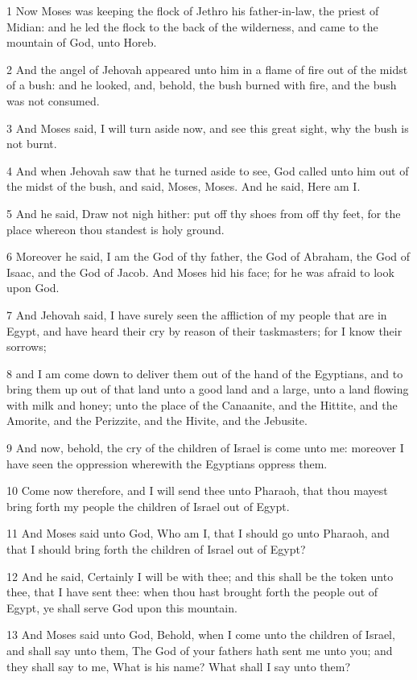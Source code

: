 \par 1 Now Moses was keeping the flock of Jethro his father-in-law, the priest of Midian: and he led the flock to the back of the wilderness, and came to the mountain of God, unto Horeb.
\par 2 And the angel of Jehovah appeared unto him in a flame of fire out of the midst of a bush: and he looked, and, behold, the bush burned with fire, and the bush was not consumed.
\par 3 And Moses said, I will turn aside now, and see this great sight, why the bush is not burnt.
\par 4 And when Jehovah saw that he turned aside to see, God called unto him out of the midst of the bush, and said, Moses, Moses. And he said, Here am I.
\par 5 And he said, Draw not nigh hither: put off thy shoes from off thy feet, for the place whereon thou standest is holy ground.
\par 6 Moreover he said, I am the God of thy father, the God of Abraham, the God of Isaac, and the God of Jacob. And Moses hid his face; for he was afraid to look upon God.
\par 7 And Jehovah said, I have surely seen the affliction of my people that are in Egypt, and have heard their cry by reason of their taskmasters; for I know their sorrows;
\par 8 and I am come down to deliver them out of the hand of the Egyptians, and to bring them up out of that land unto a good land and a large, unto a land flowing with milk and honey; unto the place of the Canaanite, and the Hittite, and the Amorite, and the Perizzite, and the Hivite, and the Jebusite.
\par 9 And now, behold, the cry of the children of Israel is come unto me: moreover I have seen the oppression wherewith the Egyptians oppress them.
\par 10 Come now therefore, and I will send thee unto Pharaoh, that thou mayest bring forth my people the children of Israel out of Egypt.
\par 11 And Moses said unto God, Who am I, that I should go unto Pharaoh, and that I should bring forth the children of Israel out of Egypt?
\par 12 And he said, Certainly I will be with thee; and this shall be the token unto thee, that I have sent thee: when thou hast brought forth the people out of Egypt, ye shall serve God upon this mountain.
\par 13 And Moses said unto God, Behold, when I come unto the children of Israel, and shall say unto them, The God of your fathers hath sent me unto you; and they shall say to me, What is his name? What shall I say unto them?
